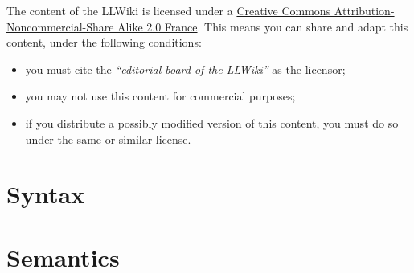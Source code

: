 \documentclass[a4paper,11pt,oneside]{book}
\begin{document}
\vspace{1cm}


The content of the LLWiki is licensed under a \href{http://creativecommons.org/licenses/by-nc-sa/2.0/fr/deed.en License}{Creative Commons Attribution-Noncommercial-Share Alike 2.0 France}.
This means you can share and adapt this content, under the following conditions:
\begin{itemize}
\item you must cite the \emph{``editorial board of the LLWiki''} as the licensor;
\item you may not use this content for commercial purposes;
\item if you distribute a possibly modified version of this content, you must do so under the same or similar license.
\end{itemize}



\tableofcontents

\part{Syntax}


































\part{Semantics}





















\appendix





\end{document}
